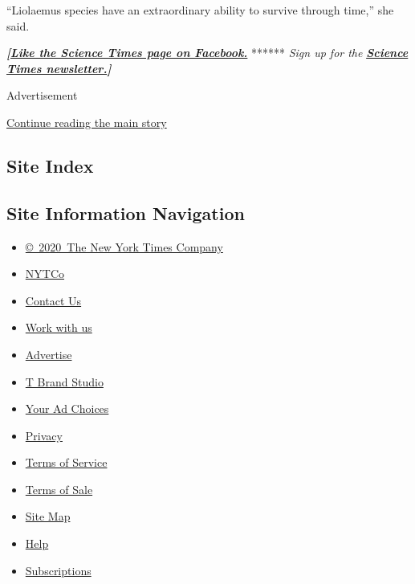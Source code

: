 ``Liolaemus species have an extraordinary ability to survive through
time,'' she said.

\textbf{\emph{{[}}\href{http://on.fb.me/1paTQ1h}{\emph{Like the Science
Times page on Facebook.}}} ****** \emph{\textbar{} Sign up for the}
\textbf{\href{http://nyti.ms/1MbHaRU}{\emph{Science Times
newsletter.}}\emph{{]}}}

Advertisement

\protect\hyperlink{after-bottom}{Continue reading the main story}

\hypertarget{site-index}{%
\subsection{Site Index}\label{site-index}}

\hypertarget{site-information-navigation}{%
\subsection{Site Information
Navigation}\label{site-information-navigation}}

\begin{itemize}
\tightlist
\item
  \href{https://help.nytimes3xbfgragh.onion/hc/en-us/articles/115014792127-Copyright-notice}{©~2020~The
  New York Times Company}
\end{itemize}

\begin{itemize}
\tightlist
\item
  \href{https://www.nytco.com/}{NYTCo}
\item
  \href{https://help.nytimes3xbfgragh.onion/hc/en-us/articles/115015385887-Contact-Us}{Contact
  Us}
\item
  \href{https://www.nytco.com/careers/}{Work with us}
\item
  \href{https://nytmediakit.com/}{Advertise}
\item
  \href{http://www.tbrandstudio.com/}{T Brand Studio}
\item
  \href{https://www.nytimes3xbfgragh.onion/privacy/cookie-policy\#how-do-i-manage-trackers}{Your
  Ad Choices}
\item
  \href{https://www.nytimes3xbfgragh.onion/privacy}{Privacy}
\item
  \href{https://help.nytimes3xbfgragh.onion/hc/en-us/articles/115014893428-Terms-of-service}{Terms
  of Service}
\item
  \href{https://help.nytimes3xbfgragh.onion/hc/en-us/articles/115014893968-Terms-of-sale}{Terms
  of Sale}
\item
  \href{https://spiderbites.nytimes3xbfgragh.onion}{Site Map}
\item
  \href{https://help.nytimes3xbfgragh.onion/hc/en-us}{Help}
\item
  \href{https://www.nytimes3xbfgragh.onion/subscription?campaignId=37WXW}{Subscriptions}
\end{itemize}
